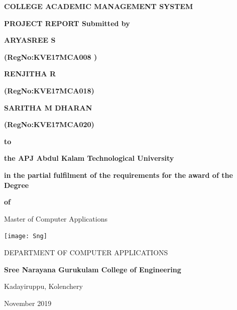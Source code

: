 \documentclass[a4paper, 12pt]{report}
\begin{document}
\begin{titlepage}
\centering
	{\bfseries\fontsize{16pt}{16pt}\selectfont COLLEGE ACADEMIC MANAGEMENT SYSTEM\par}
\vspace{.5cm}
	{\fontsize{12pt}{12pt}\selectfont\bfseries PROJECT REPORT Submitted by \par}
	\vspace{.3cm}
	\begin{center}
	{\fontsize{14pt}{14pt}\selectfont\bfseries ARYASREE S \par}
	\vspace{.2cm}
	{\fontsize{12pt}{12pt}\selectfont\bfseries (RegNo:KVE17MCA008 )\par}
        {\fontsize{14pt}{14pt}\selectfont\bfseries  RENJITHA R \par}
\vspace{.2cm}
{\fontsize{12pt}{12pt}\selectfont\bfseries (RegNo:KVE17MCA018)\par}
\vspace{.2cm} 
{\fontsize{14pt}{14pt}\selectfont\bfseries SARITHA M DHARAN\par}
\vspace{.2cm}
{\fontsize{12pt}{12pt}\selectfont\bfseries (RegNo:KVE17MCA020)\par}
	\vspace{.5cm}
\end{center}
{\fontsize{12pt}{12pt}\selectfont\bfseries to \par}
	{\fontsize{12pt}{12pt}\selectfont\bfseries the APJ Abdul Kalam Technological University\par}
{\fontsize{12pt}{12pt}\selectfont\bfseries in the partial fulfilment of the requirements for the award of the Degree \par}
{\fontsize{12pt}{12pt}\selectfont\bfseries of  \par}
{\fontsize{12pt}{12pt}\selectfont\begin{textit} Master of Computer Applications\end{textit} \par}
\texttt{[image: Sng]}\par\vspace{0.2cm}
{\fontsize{14pt}{14pt}\selectfont DEPARTMENT OF COMPUTER APPLICATIONS \par}
    \vspace{0.2cm}
	{\fontsize {14pt}{14pt}\selectfont\bfseries Sree Narayana Gurukulam College of Engineering \par}
	\vspace{0.2cm}
	{\fontsize{14pt}{14pt}\selectfont Kadayiruppu, Kolenchery \par}
{\fontsize{14pt}{14pt}\selectfont November 2019 \par}

\end{titlepage}
\end{document}
